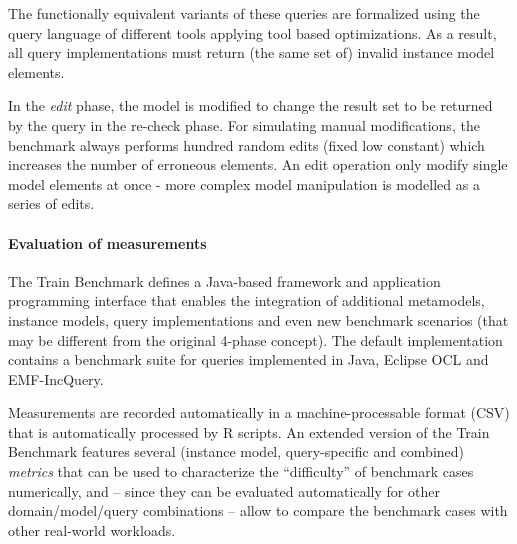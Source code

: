 The functionally equivalent variants of these queries are formalized using the
query language of different tools applying tool based optimizations. As a
result, all query implementations must return (the same set of) invalid instance
model elements.
 
In the \emph{edit} phase, the model is modified to change the result set to be
returned by the query in the re-check phase. For simulating manual
modifications, the benchmark always performs hundred random edits (fixed low
constant) which increases the number of erroneous elements. An edit operation
only modify single model elements at once - more complex model manipulation is
modelled as a series of edits.

\paragraph{Evaluation of measurements}
The Train Benchmark defines a Java-based framework and application programming
interface that enables the integration of additional metamodels, instance
models, query implementations and even new benchmark scenarios (that may be
different from the original 4-phase concept). The default implementation
contains a benchmark suite for queries implemented in Java, Eclipse OCL and
EMF-IncQuery.

Measurements are recorded automatically in a machine-processable format (CSV)
that is automatically processed by R \cite{TB:R} scripts. An extended version of the Train
Benchmark \cite{TB:ASE2013} features several (instance model, query-specific and
combined) \emph{metrics} that can be used to characterize the ``difficulty'' of
benchmark cases numerically, and -- since they can be evaluated automatically
for other domain/model/query combinations -- allow to compare the benchmark
cases with other real-world workloads.
